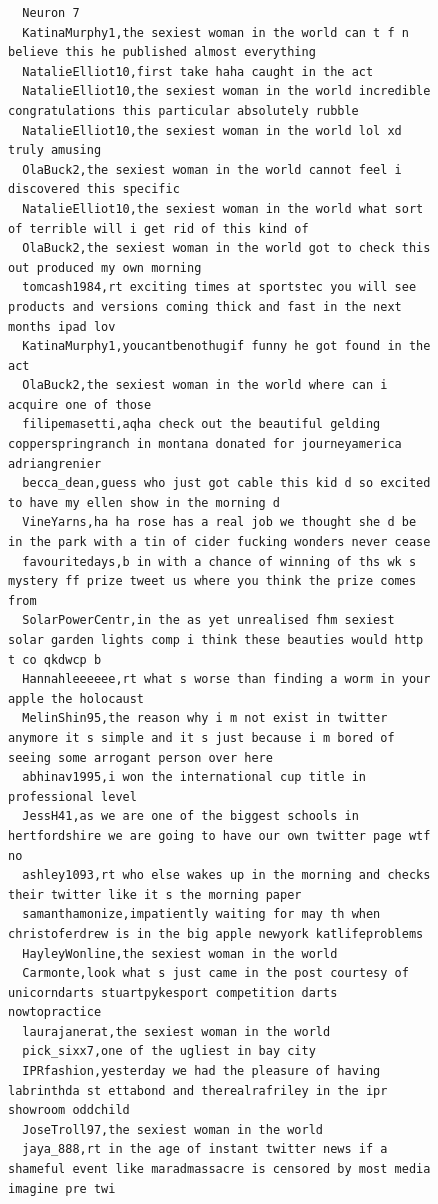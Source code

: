 \begin{figure}[htpb]
\begin{verbatim}
  Neuron 7
  KatinaMurphy1,the sexiest woman in the world can t f n believe this he published almost everything
  NatalieElliot10,first take haha caught in the act
  NatalieElliot10,the sexiest woman in the world incredible congratulations this particular absolutely rubble
  NatalieElliot10,the sexiest woman in the world lol xd truly amusing
  OlaBuck2,the sexiest woman in the world cannot feel i discovered this specific
  NatalieElliot10,the sexiest woman in the world what sort of terrible will i get rid of this kind of
  OlaBuck2,the sexiest woman in the world got to check this out produced my own morning
  tomcash1984,rt exciting times at sportstec you will see products and versions coming thick and fast in the next months ipad lov
  KatinaMurphy1,youcantbenothugif funny he got found in the act
  OlaBuck2,the sexiest woman in the world where can i acquire one of those
  filipemasetti,aqha check out the beautiful gelding copperspringranch in montana donated for journeyamerica adriangrenier
  becca_dean,guess who just got cable this kid d so excited to have my ellen show in the morning d
  VineYarns,ha ha rose has a real job we thought she d be in the park with a tin of cider fucking wonders never cease
  favouritedays,b in with a chance of winning of ths wk s mystery ff prize tweet us where you think the prize comes from
  SolarPowerCentr,in the as yet unrealised fhm sexiest solar garden lights comp i think these beauties would http t co qkdwcp b
  Hannahleeeeee,rt what s worse than finding a worm in your apple the holocaust
  MelinShin95,the reason why i m not exist in twitter anymore it s simple and it s just because i m bored of seeing some arrogant person over here
  abhinav1995,i won the international cup title in professional level
  JessH41,as we are one of the biggest schools in hertfordshire we are going to have our own twitter page wtf no
  ashley1093,rt who else wakes up in the morning and checks their twitter like it s the morning paper
  samanthamonize,impatiently waiting for may th when christoferdrew is in the big apple newyork katlifeproblems
  HayleyWonline,the sexiest woman in the world
  Carmonte,look what s just came in the post courtesy of unicorndarts stuartpykesport competition darts nowtopractice
  laurajanerat,the sexiest woman in the world
  pick_sixx7,one of the ugliest in bay city
  IPRfashion,yesterday we had the pleasure of having labrinthda st ettabond and therealrafriley in the ipr showroom oddchild
  JoseTroll97,the sexiest woman in the world
  jaya_888,rt in the age of instant twitter news if a shameful event like maradmassacre is censored by most media imagine pre twi

\end{verbatim}
\end{figure}
